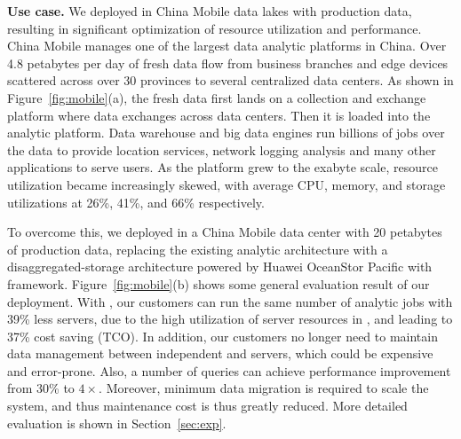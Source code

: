  





\noindent \textbf{Use case.} We deployed \sys  in China Mobile data lakes with production data, resulting in significant optimization of resource utilization and performance.  China Mobile manages one of the largest data analytic platforms in China.
Over 4.8 petabytes per day of fresh data flow from business branches and edge devices scattered across over 30 provinces to several centralized data centers. As shown in Figure~\ref{fig:mobile}(a), the fresh data first lands on a collection and exchange platform where data exchanges across data centers. Then it is loaded into the analytic platform. Data warehouse and big data engines run billions of jobs  over the data to provide location services, network logging analysis and many other applications to serve users.
As the platform grew to the exabyte scale, resource utilization became increasingly skewed, with average CPU, memory, and storage utilizations at 26\%, 41\%, and 66\% respectively.




To overcome this, we deployed \sys in a China Mobile data center with 20 petabytes of production data, replacing the existing analytic architecture with a disaggregated-storage architecture powered by Huawei OceanStor Pacific with  \sys framework.
 Figure~\ref{fig:mobile}(b) shows some general evaluation result of our deployment. With \sys, our customers can  run the same number of analytic jobs with 39\% less servers, due to the high utilization of   server resources in \sys, and leading to 37\% cost saving (TCO).   In addition, our customers no longer need to maintain data management between independent \kafka and \hdfs servers, which could be expensive and error-prone. 
 Also, a number of  queries can achieve performance improvement from  30\% to $4\times$.
Moreover, minimum data migration is required to scale the system, and thus maintenance cost is thus greatly reduced.
 More detailed evaluation is shown in Section~\ref{sec:exp}.


